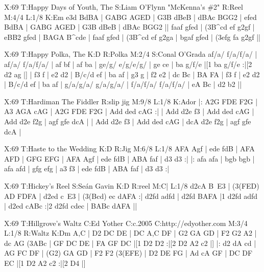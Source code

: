 \documentclass{article}
\begin{document}
\begin{abc}[name]
X:69
T:Happy Days of Youth, The
S:Liam O'Flynn "McKenna's \#2"
R:Reel
M:4/4
L:1/8
K:Em
e3d BdBA | GABG AGED | G3B dBeB | dBAc BGG2 |
efed BdBA | GABG AGED | G3B dBeB | dBAc BGG2 ||
faaf gfed | (3B^cd ef g2gf | eBB2 gfed | BAGA B^cde |
faaf gfed | (3B^cd ef g2ga | bgaf gfed | (3efg fa g2gf ||
\end{abc}

\begin{abc}[name]
X:69
T:Happy Polka, The
K:D
R:Polka
M:2/4
S:Conal O'Grada
af/a/ f/a/f/a/ |  af/a/ f/a/f/a/ | af bf | af ba |
ge/g/ e/g/e/g/ | ge ce | ba g/f/e |[1 ba g/f/e :|[2 d2 ag |]
| f3 f | e2 d2 | B/c/d ef | ba af |
g3 g | f2 e2 | dc Bc | BA FA |
f3 f | e2 d2 | B/c/d ef | ba af |
g/a/g/a/ g/a/g/a/ | f/a/f/a/ f/a/f/a/ | eA Bc | d2 b2 ||
\end{abc}

\begin{abc}[name]
X:69
T:Hardiman The Fiddler
R:slip jig
M:9/8
L:1/8
K:Ador
|: A2G FDE F2G | A3 AGA cAG | A2G FDE F2G | Add ded cAG :|
| Add d2e f3 | Add ded cAG | Add d2e f2g | agf gfe dcA |
| Add d2e f3 | Add ded cAG | dcA d2e f2g | agf gfe dcA |
\end{abc}

\begin{abc}[name]
X:69
T:Haste to the Wedding
K:D
R:Jig
M:6/8
L:1/8
AFA Agf | ede fdB | AFA AFD | GFG EFG |
AFA Agf | ede fdB | ABA faf | d3 d3 :|
|: afa afa | bgb bgb | afa afd | gfg efg |
a3 f3 | ede fdB | ABA faf | d3 d3 :|
\end{abc}

\begin{abc}[name]
X:69
T:Hickey's Reel
S:Seán Gavin
K:D
R:reel
M:C|
L:1/8
d2cA B~E3 | (3(FED) AD FDFA | d2ed c~E3 | (3(Bcd) ec dAFA :|
d2fd adfd | d2fd BAFA |1 d2fd adfd | d2ed cABc :|2 d2fd cdec | BABc dAFA ||
\end{abc}

\begin{abc}[name]
X:69
T:Hillgrove's Waltz
C:Ed Yother
C:c.2005
C:http://edyother.com
M:3/4
L:1/8
R:Waltz
K:Dm
A,C | D2 DC DE | DC A,C DF | G2 GA GD | F2 G2 A2 |
 dc AG  (3ABc | GF DC DE | FA  GF  DC |[1 D2 D2 :|[2 D2 A2 c2 |]
|: d2 dA cd | AG FC DF | (G2) GA GD | F2 F2 (3(EFE) |
 D2 DE FG | Ad cA GF | DC  DF  EC |[1 D2 A2 c2 :|[2  D4 |]
\end{abc}
\end{document}
